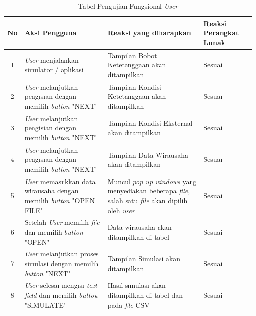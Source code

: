 \begin{table}[H]
\centering
\caption{Tabel Pengujian Fungsional \textit{User}}
\begin{tabular}{|c|p{6cm}|p{4cm}|p{2cm}|}
\hline
No & Aksi Pengguna & Reaksi yang diharapkan & Reaksi Perangkat Lunak\\
\hline
1 & \textit{User} menjalankan simulator / aplikasi & Tampilan Bobot Ketetanggaan akan ditampilkan & Sesuai\\
\hline
2 & \textit{User} melanjutkan pengisian dengan memilih \textit{button} "NEXT" & Tampilan Kondisi Ketetanggaan akan ditampilkan & Sesuai\\
\hline
3 & \textit{User} melanjutkan pengisian dengan memilih \textit{button} "NEXT" & Tampilan Kondisi Eksternal akan ditampilkan & Sesuai\\
\hline
4 & \textit{User} melanjutkan pengisian dengan memilih \textit{button} "NEXT" & Tampilan Data Wirausaha akan ditampilkan & Sesuai\\
\hline
5 & \textit{User} memasukkan data wirausaha dengan memilih \textit{button} "OPEN FILE" & Muncul \textit{pop up windows} yang menyediakan beberapa \textit{file}, salah satu \textit{file} akan dipilih oleh \textit{user} & Sesuai\\
\hline
6 & Setelah \textit{User} memilih \textit{file} dan memilih \textit{button} "OPEN" & Data wirausaha akan ditampilkan di tabel & Sesuai\\
\hline
7 & \textit{User} melanjutkan proses simulasi dengan memilih \textit{button} "NEXT" & Tampilan Simulasi akan ditampilkan & Sesuai\\
\hline
8 & \textit{User} selesai mengisi \textit{text field} dan memilih \textit{button} "SIMULATE" & Hasil simulasi akan ditampilkan di tabel dan pada \textit{file} CSV & Sesuai\\
\hline 

\end{tabular}
\label{tabelFungsional}
\end{table} 

